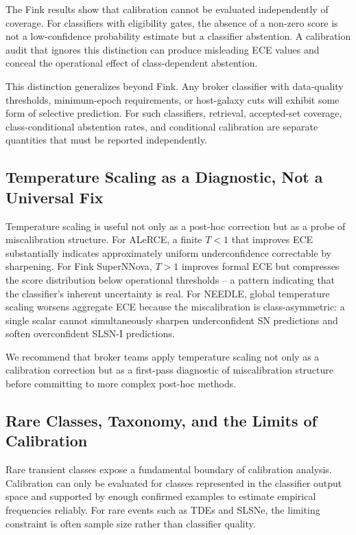 \documentclass[a4paper,fleqn,usenatbib]{mnras}
\begin{document}
The Fink results show that calibration cannot be evaluated
independently of coverage. For classifiers with eligibility gates,
the absence of a non-zero score is not a low-confidence probability
estimate but a classifier abstention. A calibration audit that
ignores this distinction can produce misleading ECE values and
conceal the operational effect of class-dependent abstention.

This distinction generalizes beyond Fink. Any broker classifier
with data-quality thresholds, minimum-epoch requirements, or
host-galaxy cuts will exhibit some form of selective prediction.
For such classifiers, retrieval, accepted-set coverage,
class-conditional abstention rates, and conditional calibration
are separate quantities that must be reported independently.

\subsection{Temperature Scaling as a Diagnostic, Not a Universal
Fix}\label{sec:disc_tempscaling}

Temperature scaling is useful not only as a post-hoc correction
but as a probe of miscalibration structure. For ALeRCE, a finite
$T < 1$ that improves ECE substantially indicates approximately
uniform underconfidence correctable by sharpening. For Fink
SuperNNova, $T > 1$ improves formal ECE but compresses the score
distribution below operational thresholds -- a pattern indicating
that the classifier's inherent uncertainty is real. For NEEDLE,
global temperature scaling worsens aggregate ECE because the
miscalibration is class-asymmetric: a single scalar cannot
simultaneously sharpen underconfident SN predictions and soften
overconfident SLSN-I predictions.

We recommend that broker teams apply temperature scaling not only
as a calibration correction but as a first-pass diagnostic of
miscalibration structure before committing to more complex
post-hoc methods.

\subsection{Rare Classes, Taxonomy, and the Limits of
Calibration}\label{sec:disc_rare}

Rare transient classes expose a fundamental boundary of
calibration analysis. Calibration can only be evaluated for
classes represented in the classifier output space and supported
by enough confirmed examples to estimate empirical frequencies
reliably. For rare events such as TDEs and SLSNe, the limiting
constraint is often sample size rather than classifier quality.
\end{document}
